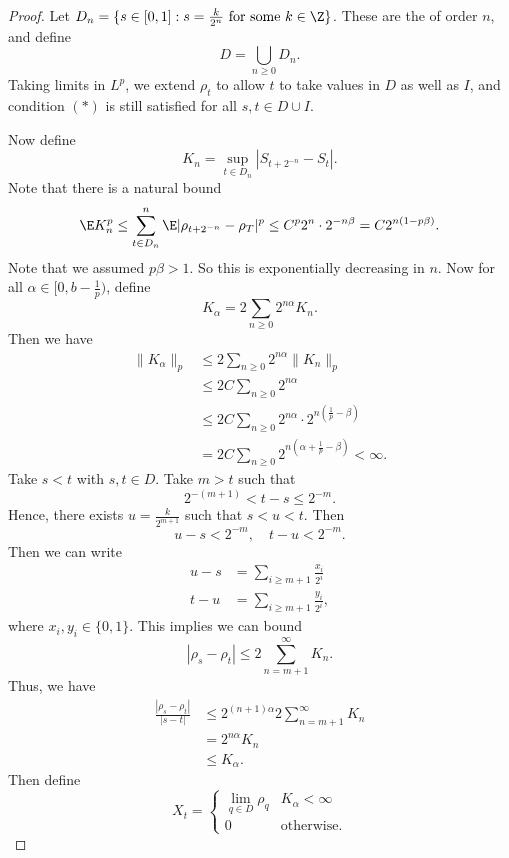 \documentclass[a4paper]{article}
\begin{document}
\begin{proof}
  Let $D_n = \{s \in [0, 1] : s = \frac{k}{2^n}\text{ for some }k \in \Z\}$. These are the  of order $n$, and define
  \[
    D = \bigcup_{n \geq 0}D_n.
  \]
  Taking limits in $L^p$, we extend $\rho_t$ to allow $t$ to take values in $D$ as well as $I$, and condition $(*)$ is still satisfied for all $s, t \in D \cup I$.

  Now define
  \[
    K_n = \sup_{t \in D_n} |S_{t + 2^{-n}} - S_t|.
  \]
  Note that there is a natural bound
  \[
    \E K_n^p \leq \sum_{t \in D_n}^n \E |\rho_{t + 2^{-n}} - \rho_T|^p \leq C^p 2^n \cdot 2^{-n \beta} = C 2^{n(1 - p\beta)}.
  \]
  Note that we assumed $p\beta > 1$. So this is exponentially decreasing in $n$. Now for all $\alpha \in [0, b - \frac{1}{p})$, define
  \[
    K_\alpha = 2 \sum_{n \geq 0} 2^{n\alpha} K_n.
  \]
  Then we have
  \begin{align*}
    \|K_\alpha\|_p &\leq 2 \sum_{n \geq 0}2^{n\alpha} \|K_n\|_p \\
    &\leq 2C \sum_{n \geq 0} 2^{n\alpha}\\
    &\leq 2C \sum_{n \geq 0} 2^{n\alpha} \cdot 2^{n\left(\frac{1}{p} - \beta\right)}\\
    &= 2C \sum_{n \geq 0} 2^{n(\alpha + \frac{1}{p} - \beta)} < \infty.
  \end{align*}
  Take $s < t$ with $s, t \in D$. Take $m > t$ such that
  \[
    2^{-(m + 1)} < t - s \leq 2^{-m}.
  \]
  Hence, there exists $u = \frac{k}{2^{m + 1}}$ such that $s < u < t$. Then
  \[
    u - s < 2^{-m},\quad t - u < 2^{-m}.
  \]
  Then we can write
  \begin{align*}
    u - s &= \sum_{i \geq m + 1} \frac{x_i}{2^i}\\
    t - u &= \sum_{i \geq m + 1} \frac{y_i}{2^i},
  \end{align*}
  where $x_i, y_i \in \{0, 1\}$. This implies we can bound
  \[
    |\rho_s - \rho_t| \leq 2 \sum_{n = m + 1}^\infty K_n.
  \]
  Thus, we have
  \begin{align*}
    \frac{|\rho_s - \rho_t|}{|s - t|} &\leq 2^{(n + 1)\alpha} 2 \sum_{n = m + 1}^\infty K_n\\
    &= 2^{n\alpha}K_n\\
    &\leq K_\alpha.
  \end{align*}
  Then define
  \[
    X_t =
    \begin{cases}
      \lim_{q \in D} \rho_q & K_\alpha < \infty\\
      0 & \text{otherwise}.
    \end{cases}
  \]
\end{proof}
\end{document}
